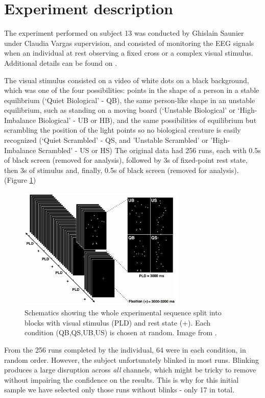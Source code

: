 \documentclass[a4paper]{article}
\begin{document}
\section{Experiment description}

The experiment performed on subject 13 was conducted by Ghislain Saunier under Claudia Vargas supervision, and consisted of monitoring the EEG signals when an individual at rest observing a fixed cross or a complex visual stimulus. Additional details can be found on \cite{vargas17}.

The visual stimulus consisted on a video of white dots on a black background, which was one of the four possibilities: points in the shape of a person in a stable equilibrium (`Quiet Biological' - QB), the same person-like shape in an unstable equilibrium, such as standing on a moving board (`Unstable Biological' or `High-Imbalance Biological' - UB or HB), and the same possibilities of equilibrium but scrambling the position of the light points so no biological creature is easily recognized (`Quiet Scrambled' - QS, and 'Unstable Scrambled' or 'High-Imbalance Scrambled' - US or HS)
The original data had 256 runs, each with 0.5s of black screen (removed for analysis), followed by 3s of fixed-point rest state, then 3s of stimulus and, finally, 0.5s of black screen (removed for analysis). (Figure \ref{figvargas1})

\begin{figure}[H]\label{figvargas1}
\centering
\includegraphics[width=8cm]{figvargas.png}
\caption{Schematics showing the whole experimental sequence split into blocks with visual stimulus (PLD) and rest state (+). Each condition (QB,QS,UB,US) is chosen at random. Image from \cite{vargas17}.}
\end{figure}

From the 256 runs completed by the individual, 64 were in each condition, in random order. However, the subject unfortunately blinked in most runs. Blinking produces a large disruption across \emph{all} channels, which might be tricky to remove without impairing the confidence on the results. This is why for this initial sample we have selected only those runs without blinks - only 17 in total. 
\end{document}
